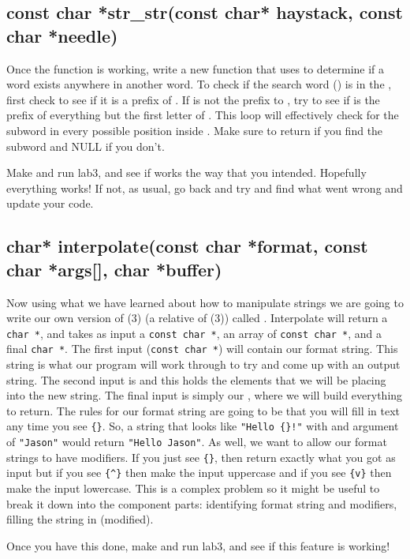 \documentclass{tufte-handout}
\begin{document}
\subsection{{const char *str\_str(const char* haystack, const
char *needle)}}

Once the function  is working, write a new
function  that uses  to determine if a word exists anywhere in another word. To check if the search word () is in the , first check to see if it is a prefix of . If  is not the prefix to , try to see if  is the prefix of everything but the first letter of . This loop will effectively check for the subword  in every possible position inside . Make sure to return  if you find the subword and NULL if you don't.

Make and run lab3, and see if  works the way that you intended.  Hopefully everything works!  If not, as usual, go back and try and find what went wrong and update your code.

\subsection{{char* interpolate(const char *format, const char *args[], char *buffer)}}

Now using what we have learned about how to manipulate strings we are
going to write our own version of (3) (a relative
of (3)) called
. Interpolate will return a \texttt{char *}, and takes
as input a \texttt{const char *}, an array of \texttt{const char *}, and
a final \texttt{char *}. The
first input (\texttt{const char *})  will contain our format
string. This string is what our program will work through to try and
come up with an output string. The second input is  and
this holds the elements that we will be placing into the new string. The
final input is simply our , where we will build
everything to return. The rules for our format string are going to be
that you will fill in text any time you see \texttt{\{\}}. So, a string that
looks like \texttt{"Hello \{\}!"} with and argument of \texttt{"Jason"} would return
\texttt{"Hello Jason"}. As well, we want to allow our format strings to have
modifiers. If you just see \texttt{\{\}}, then return exactly what you got as
input but if you see \verb!{^}! then make the input uppercase and if you see
\texttt{\{v\}} then make the input lowercase. This is a complex problem so it might be useful to break it down into the component parts: identifying format string and modifiers, filling the string in (modified).

Once you have this done, make and run lab3, and see if this feature is working!
\end{document}

